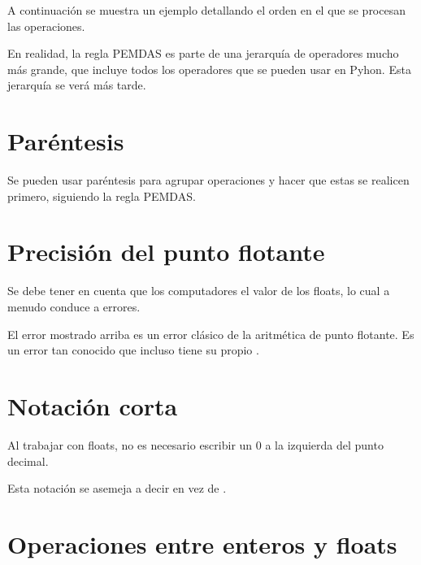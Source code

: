 A continuación se muestra un ejemplo detallando el orden en el que se procesan las operaciones.


En realidad, la regla PEMDAS es parte de una jerarquía de operadores mucho más grande, que incluye todos los operadores que se pueden usar en Pyhon.
Esta jerarquía se verá más tarde.

\section{Paréntesis}

Se pueden usar paréntesis \ttt{()} para agrupar operaciones y hacer que estas se realicen primero, siguiendo la regla PEMDAS.


\section{Precisión del punto flotante}

Se debe tener en cuenta que los computadores  el valor de los floats, lo cual a menudo conduce a errores.


El error mostrado arriba es un error clásico de la aritmética de punto flotante.
Es un error tan conocido que incluso tiene su propio .

\section{Notación corta}

Al trabajar con floats, no es necesario escribir un 0 a la izquierda del punto decimal.


Esta notación se asemeja a decir  en vez de .

\section{Operaciones entre enteros y floats}

